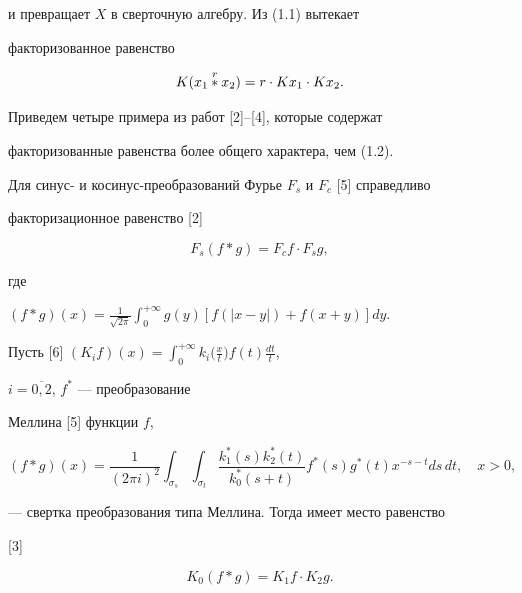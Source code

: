 и превращает $X$ в сверточную алгебру. Из (1.1) вытекает


факторизованное равенство


\begin{equation}


K(x_1\up{r}{}x_2)=r\cdot Kx_1\cdot Kx_2.


\end{equation}





Приведем четыре примера из работ [2]--[4], которые содержат


факторизованные равенства более общего характера, чем (1.2).





\begin{exam}


Для синус- и косинус-преобразований Фурье $F_s$ и $F_c$ [5] справедливо


факторизационное равенство [2]


\begin{equation}


F_s(f\ast g)=F_cf\cdot F_sg,


\end{equation}


где


$(f\ast g)(x)=\frac{1}{\sqrt{2\pi}}\int^{+\infty}_0


g(y)[f(|x-y|)+f(x+y)]dy$.


\end{exam}





\begin{exam}


Пусть [6] $(K_if)(x)=\int^{+\infty}_0


k_i\bigl(\frac{x}{t}\bigr)f(t)\frac{dt}{t}$,


$i=\overline{0,2}$, $f^\ast$ --- преобразование


Меллина [5] функции $f$,


$$


(f\ast g)(x)=\frac{1}{(2\pi i)^2}\int_{\sigma_s}


\int_{\sigma_t}\frac{k^\ast_1(s)k^\ast_2(t)}


{k^\ast_0(s+t)}f^\ast(s)g^\ast(t)x^{-s-t}ds\,dt,


\quad x>0,


$$


--- свертка преобразования типа Меллина. Тогда имеет место равенство


[3]


\begin{equation}


K_0(f\ast g)=K_1f\cdot K_2g.


\end{equation}


\end{exam}





